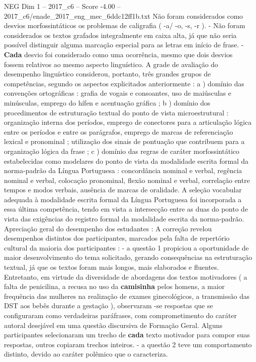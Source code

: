 \begin{textsample}{NEG Dim 1 – 2017\_c6 – Score -4.00 – 2017\_c6/enade\_2017\_eng\_mec\_6ddc12ff1b.txt}
Não foram considerados como desvios morfossintáticos os problemas de caligrafia ( -a/ -o, -s, -r ). - Não foram considerados os textos grafados integralmente em caixa alta, já que não seria possível distinguir alguma marcação especial para as letras em início de frase. - \textbf{Cada} desvio foi considerado como uma ocorrência, mesmo que dois desvios fossem relativos ao mesmo aspecto linguístico.
A grade de avaliação do desempenho linguístico considerou, portanto, três grandes grupos de competências, segundo os aspectos explicitados anteriormente : a ) domínio das convenções ortográficas : grafia de vogais e consoantes, uso de maiúsculas e minúsculas, emprego do hífen e acentuação gráfica ; b ) domínio dos procedimentos de estruturação textual do ponto de vista microestrutural : organização interna dos períodos, emprego de conectores para a articulação lógica entre os períodos e entre os parágrafos, emprego de marcas de referenciação lexical e pronominal ; utilização dos sinais de pontuação que contribuem para a organização lógica da frase ; c ) domínio das regras de caráter morfossintático estabelecidas como modelares do ponto de vista da modalidade escrita formal da norma-padrão da Língua Portuguesa : concordância nominal e verbal, regência nominal e verbal, colocação pronominal, flexão nominal e verbal, correlação entre tempos e modos verbais, ausência de marcas de oralidade.
A seleção vocabular adequada à modalidade escrita formal da Língua Portuguesa foi incorporada a essa última competência, tendo em vista a intersecção entre as duas do ponto de vista das exigências do registro formal da modalidade escrita da norma-padrão.
Apreciação geral do desempenho dos estudantes : A correção revelou desempenhos distintos dos participantes, marcados pela falta de repertório cultural da maioria dos participantes : - a questão 1 propiciou a oportunidade de maior desenvolvimento do tema solicitado, gerando consequências na estruturação textual, já que os textos foram mais longos, mais elaborados e fluentes.
Entretanto, em virtude da diversidade de abordagens dos textos motivadores ( a falta de penicilina, a recusa no uso da \textbf{camisinha} pelos homens, a maior frequência das mulheres na realização de exames ginecológicos, a transmissão das DST aos bebês durante a gestação ), observaram -se respostas que se configuraram como verdadeiras paráfrases, com comprometimento do caráter autoral desejável em uma questão discursiva de Formação Geral.
Alguns participantes selecionaram um trecho de \textbf{cada} texto motivador para compor suas respostas, outros copiaram trechos inteiros. - a questão 2 teve um comportamento distinto, devido ao caráter polêmico que o caracteriza.

\end{textsample}
